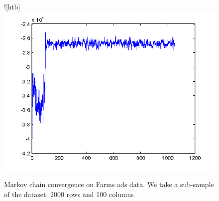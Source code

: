 \begin{figure}![htb]
\includegraphics[width=1\textwidth]{samplingConvergence.png}
\caption{Markov chain convergence on Farms ads data. We take a sub-sample of
the dataset: 2000 rows and 100 columns}
\label{fig:MCMCconverge}
\end{figure}